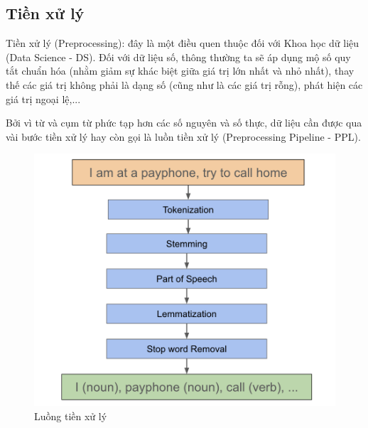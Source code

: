 \subsection{Tiền xử lý}
\label{preprocessing}
Tiền xử lý (Preprocessing): đây là một điều quen thuộc đối với Khoa học dữ liệu (Data Science - DS). Đối với dữ liệu số, thông thường ta sẽ áp dụng mộ số quy tắt chuẩn hóa (nhằm giảm sự khác biệt giữa giá trị lớn nhất và nhỏ nhất), thay thế các giá trị không phải là dạng số (cũng như là các giá trị rỗng), phát hiện các giá trị ngoại lệ,...

Bởi vì từ và cụm từ phức tạp hơn các số nguyên và số thực, dữ liệu cần được qua vài bước tiền xử lý hay còn gọi là luồn tiền xử lý (Preprocessing Pipeline - PPL). 

\begin{figure}[h!]
\begin{center}
	\includegraphics[width=1.0\textwidth]{chapter04/figure/pre_processing.png}
	\caption{Luồng tiền xử lý}
	\label{fig:nlp-classic}
\end{center}
\end{figure}

